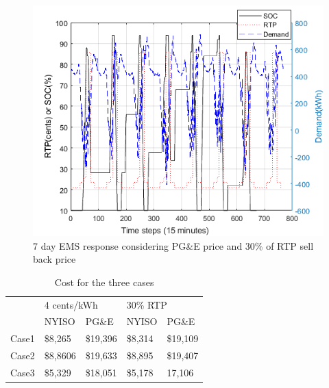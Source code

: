  \begin{figure}[!ht]
    \centering
    \includegraphics[width = \linewidth]{figs/PG_VAR_10_12_30rtp.png}
    \caption{7 day EMS response considering PG\&E price and 30\% of RTP sell back price}
    \label{fig:PG_VAR_10_12_30rtp}
\end{figure}


\begin{table}[htb]
\normalsize
\renewcommand{\arraystretch}{1}
\caption{Cost for the three cases}
\label{tab:Cost}
\centering

\begin{tabular}{l|l|l|l|l|}
\cline{2-5}
                            & \multicolumn{2}{l|}{4 cents/kWh} & \multicolumn{2}{l|}{30\% RTP}   \\ \cline{2-5} 
                            & NYISO           & PG\&E          & NYISO          & PG\&E          \\ \hline
\multicolumn{1}{|l|}{Case1} & \$8,265  & \$19,396 & \$8,314 & \$19,109 \\ \hline
\multicolumn{1}{|l|}{Case2} & \$8,8606  & \$19,633 & \$8,895 & \$19,407 \\ \hline
\multicolumn{1}{|l|}{Case3} & \$5,329  & \$18,051 & \$5,178 & 17,106 \\ \hline
\end{tabular}

\end{table}




